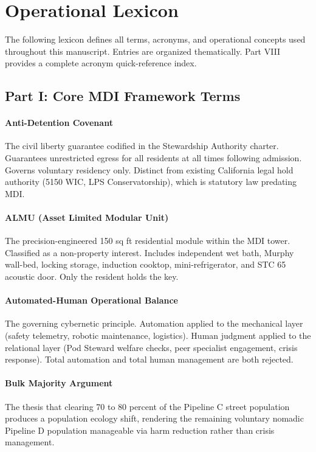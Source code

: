 \section{Operational Lexicon}
{\small

The following lexicon defines all terms, acronyms, and operational concepts used throughout this manuscript. Entries are organized thematically. Part VIII provides a complete acronym quick-reference index.

\subsection*{Part I: Core MDI Framework Terms}

\paragraph{Anti-Detention Covenant} The civil liberty guarantee codified in the Stewardship Authority charter. Guarantees unrestricted egress for all residents at all times following admission. Governs voluntary residency only. Distinct from existing California legal hold authority (5150 WIC, LPS Conservatorship), which is statutory law predating MDI.

\paragraph{ALMU (Asset Limited Modular Unit)} The precision-engineered 150 sq ft residential module within the MDI tower. Classified as a non-property interest. Includes independent wet bath, Murphy wall-bed, locking storage, induction cooktop, mini-refrigerator, and STC 65 acoustic door. Only the resident holds the key.

\paragraph{Automated-Human Operational Balance} The governing cybernetic principle. Automation applied to the mechanical layer (safety telemetry, robotic maintenance, logistics). Human judgment applied to the relational layer (Pod Steward welfare checks, peer specialist engagement, crisis response). Total automation and total human management are both rejected.

\paragraph{Bulk Majority Argument} The thesis that clearing 70 to 80 percent of the Pipeline C street population produces a population ecology shift, rendering the remaining voluntary nomadic Pipeline D population manageable via harm reduction rather than crisis management.

}
